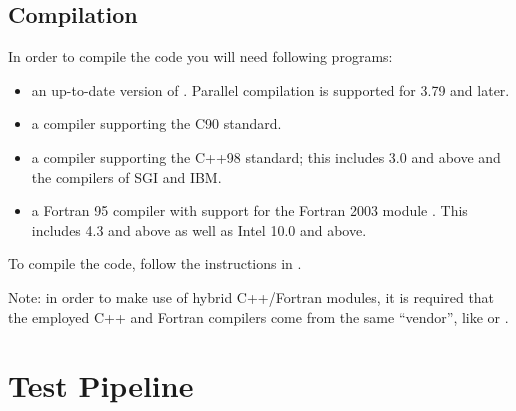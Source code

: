 \documentclass[pdf]{planckDoc}
\begin{document}
\subsection{Compilation}

In order to compile the code you will need following programs:
\begin{itemize}
   \item an up-to-date version of . Parallel compilation is
     supported for  3.79 and later.
   \item a  compiler supporting the C90 standard.
   \item a  compiler supporting the C++98 standard; this includes
      3.0 and above and the compilers of SGI and IBM.
   \item a Fortran 95 compiler with support for the Fortran 2003 module
     . This includes  4.3 and above as well
     as Intel  10.0 and above.
\end{itemize}
To compile the code, follow the instructions
in .

Note: in order to make use of hybrid C++/Fortran modules, it is required that
the employed C++ and Fortran compilers come from the same ``vendor'', like
 or .

\clearpage
\section{Test Pipeline}
\end{document}
